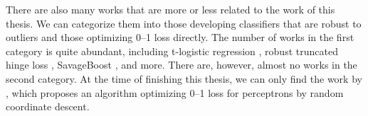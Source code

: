 There are also many works that are more or less related to the work of
this thesis. We can categorize them into those developing classifiers
that are robust to outliers and those optimizing 0--1 loss
directly. The number of works in the first category is quite abundant,
including t-logistic regression \cite{Ding}, robust truncated hinge
loss \cite{robusthinge}, SavageBoost \cite{lossdesign}, and
more. There are, however, almost no works in the second category. At
the time of finishing this thesis, we can only find the work by
\cite{ling}, which proposes an algorithm optimizing 0--1 loss for
perceptrons by random coordinate descent.

\ENDCOMMENT
